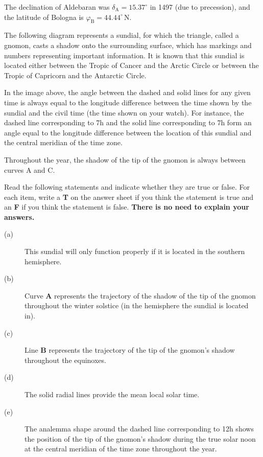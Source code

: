 The declination of Aldebaran was $\delta_{\mathrm{A}} = 15.37^\circ$ in 1497
(due to precession), and the latitude of Bologna is
$\varphi_{\mathrm{B}} = 44.44^\circ$\,N.

The following diagram represents a sundial, for which the triangle, called a
gnomon, casts a shadow onto the surrounding surface, which has markings and
numbers representing important information. It is known that this sundial is
located either between the Tropic of Cancer and the Arctic Circle or between
the Tropic of Capricorn and the Antarctic Circle.


In the image above, the angle between the dashed and solid lines for any given
time is always equal to the longitude difference between the time shown by the
sundial and the civil time (the time shown on your watch). For instance, the
dashed line corresponding to 7h and the solid line corresponding to 7h form an
angle equal to the longitude difference between the location of this sundial
and the central meridian of the time zone.

Throughout the year, the shadow of the tip of the gnomon is always between
curves A and C.

Read the following statements and indicate whether they are true or false. For
each item, write a \textbf{T} on the answer sheet if you think the statement is
true and an \textbf{F} if you think the statement is false. \textbf{There is no
need to explain your answers.}

\begin{description}
\item[(a)] This sundial will only function properly if it is located in the
  southern hemisphere.
\item[(b)] Curve \textbf{A} represents the trajectory of the shadow of the tip
  of the gnomon throughout the winter solstice (in the hemisphere the sundial
  is located in).
\item[(c)] Line \textbf{B} represents the trajectory of the tip of the gnomon's
  shadow throughout the equinoxes.
\item[(d)] The solid radial lines provide the mean local solar time.
\item[(e)] The analemma shape around the dashed line corresponding to 12h shows
  the position of the tip of the gnomon's shadow during the true solar noon at
  the central meridian of the time zone throughout the year.
\end{description}

